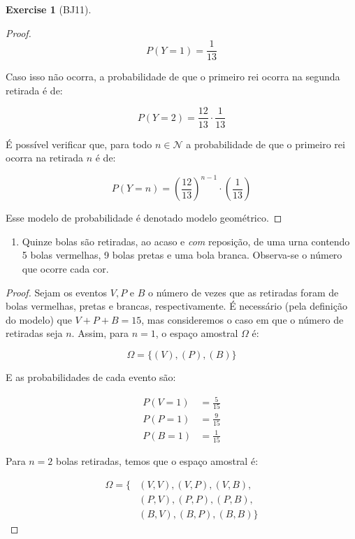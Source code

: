 \documentclass[
]{article}
\providecommand{\tightlist}{%
  \setlength{\itemsep}{0pt}\setlength{\parskip}{0pt}}
\theoremstyle{definition}
\theoremstyle{definition}
\theoremstyle{definition}
\newtheorem{exercise}{Exercise}[section]
\theoremstyle{definition}
\theoremstyle{remark}
\begin{document}
\begin{exercise}[BJ11]
\begin{proof}
\begin{equation*}
P(Y = 1) = \frac{1}{13}
\end{equation*}

Caso isso não ocorra, a probabilidade de que o primeiro rei ocorra na segunda retirada é de:

\begin{equation*}
P(Y = 2) = \frac{12}{13} \cdot \frac{1}{13}
\end{equation*}

É possível verificar que, para todo \(n \in \mathcal{N}\) a probabilidade de que o primeiro rei ocorra na retirada \(n\) é de:

\begin{equation*}
P(Y = n) = \left(\frac{12}{13}\right)^{n-1} \cdot \left(\frac{1}{13}\right)
\end{equation*}

Esse modelo de probabilidade é denotado modelo geométrico.
\end{proof}

\begin{enumerate}
\def\labelenumi{\alph{enumi})}
\setcounter{enumi}{2}
\tightlist
\item
  Quinze bolas são retiradas, ao acaso e \emph{com} reposição, de uma urna contendo 5 bolas vermelhas, 9 bolas pretas e uma bola branca. Observa-se o número que ocorre cada cor.
\end{enumerate}

\begin{proof}
Sejam os eventos \(V, P \text{ e } B\) o número de vezes que as retiradas foram de bolas vermelhas, pretas e brancas, respectivamente. É necessário (pela definição do modelo) que \(V + P + B = 15\), mas consideremos o caso em que o número de retiradas seja \(n\). Assim, para \(n = 1\), o espaço amostral \(\Omega\) é:

\begin{equation*}
\Omega = \{(V),(P),(B)\}
\end{equation*}

E as probabilidades de cada evento são:

\begin{align*}
P(V = 1) &= \frac{5}{15} \\
P(P = 1) &= \frac{9}{15} \\
P(B = 1) &= \frac{1}{15}
\end{align*}

Para \(n=2\) bolas retiradas, temos que o espaço amostral é:

\begin{align*}
\Omega = \{&(V,V), (V,P), (V,B), \\
&(P,V), (P,P), (P,B), \\
&(B,V), (B,P), (B,B)\}
\end{align*}


\end{proof}
\end{exercise}
\end{document}
